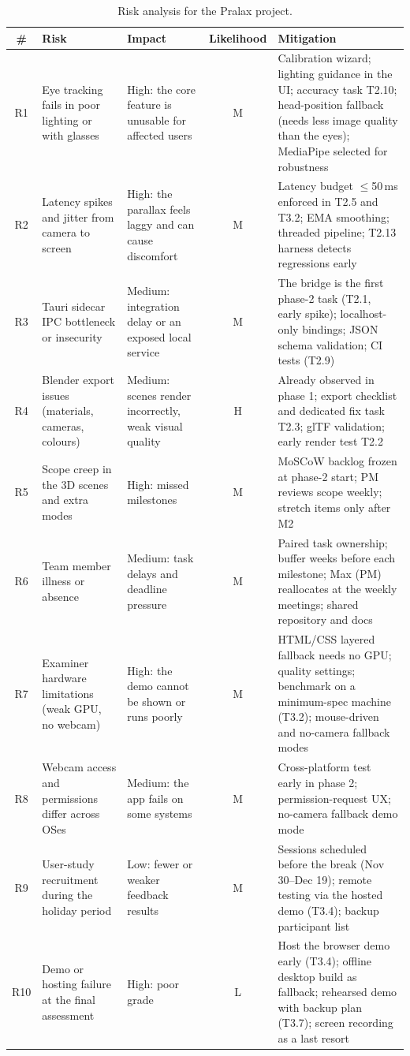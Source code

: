 \documentclass[11pt,a4paper]{article}
\begin{document}
\begin{table}[H]
\centering
\caption{Risk analysis for the Pralax project.}
\label{tab:risks}
\footnotesize
\renewcommand{\arraystretch}{1.2}
\begin{tabularx}{\textwidth}{c L L c L}
\toprule
\textbf{\#} & \textbf{Risk} & \textbf{Impact} & \textbf{Likelihood} & \textbf{Mitigation} \\
\midrule
R1 & Eye tracking fails in poor lighting or with glasses & High: the core feature is unusable for affected users & M & Calibration wizard; lighting guidance in the UI; accuracy task T2.10; head-position fallback (needs less image quality than the eyes); MediaPipe selected for robustness \\
R2 & Latency spikes and jitter from camera to screen & High: the parallax feels laggy and can cause discomfort & M & Latency budget $\leq$50\,ms enforced in T2.5 and T3.2; EMA smoothing; threaded pipeline; T2.13 harness detects regressions early \\
R3 & Tauri sidecar IPC bottleneck or insecurity & Medium: integration delay or an exposed local service & M & The bridge is the first phase-2 task (T2.1, early spike); localhost-only bindings; JSON schema validation; CI tests (T2.9) \\
R4 & Blender export issues (materials, cameras, colours) & Medium: scenes render incorrectly, weak visual quality & H & Already observed in phase 1; export checklist and dedicated fix task T2.3; glTF validation; early render test T2.2 \\
R5 & Scope creep in the 3D scenes and extra modes & High: missed milestones & M & MoSCoW backlog frozen at phase-2 start; PM reviews scope weekly; stretch items only after M2 \\
R6 & Team member illness or absence & Medium: task delays and deadline pressure & M & Paired task ownership; buffer weeks before each milestone; Max (PM) reallocates at the weekly meetings; shared repository and docs \\
R7 & Examiner hardware limitations (weak GPU, no webcam) & High: the demo cannot be shown or runs poorly & M & HTML/CSS layered fallback needs no GPU; quality settings; benchmark on a minimum-spec machine (T3.2); mouse-driven and no-camera fallback modes \\
R8 & Webcam access and permissions differ across OSes & Medium: the app fails on some systems & M & Cross-platform test early in phase 2; permission-request UX; no-camera fallback demo mode \\
R9 & User-study recruitment during the holiday period & Low: fewer or weaker feedback results & M & Sessions scheduled before the break (Nov 30--Dec 19); remote testing via the hosted demo (T3.4); backup participant list \\
R10 & Demo or hosting failure at the final assessment & High: poor grade & L & Host the browser demo early (T3.4); offline desktop build as fallback; rehearsed demo with backup plan (T3.7); screen recording as a last resort \\
\bottomrule
\end{tabularx}
\end{table}
\end{document}
